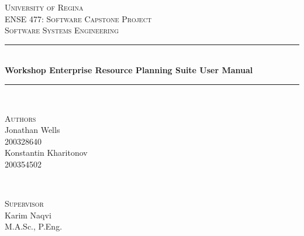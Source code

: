 \begin{titlepage} %
	\newcommand{\HRule}{\rule{\linewidth}{0.5mm}} %
	
	\center %
	
	
	\textsc{\Huge University of Regina}\\[1.5cm] %

	\textsc{\Large ENSE 477: Software Capstone Project}\\[0.5cm]
	
	\textsc{\Large Software Systems Engineering}\\[0.5cm] %
	
	
	
	
	
	\HRule\\[0.4cm]
	
	{\Huge\bfseries Workshop Enterprise Resource Planning Suite User Manual}\\[0.4cm] %
	
	\HRule\\[1.5cm]
	
	
	\begin{minipage}[t]{0.4\textwidth}
		\begin{flushleft}
			\large
			\textsc{Authors}\\
			Jonathan Wells\\
			\textsc{200328640}\\ %
			\large
			Konstantin Kharitonov\\
			\textsc{200354502} %
		\end{flushleft}
		
	\end{minipage}
	~
	\begin{minipage}[t]{0.4\textwidth}
		\begin{flushright}
			\large
			\textsc{Supervisor}\\ %
			Karim Naqvi\\
			M.A.Sc., P.Eng.\\
		\end{flushright}
	\end{minipage}
	

\end{titlepage}
